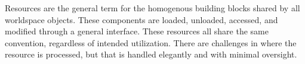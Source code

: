 Resources are the general term for the homogenous building blocks shared by all worldspace objects. These components are loaded, unloaded, accessed, and modified through a general interface. These resources all share the same convention, regardless of intended utilization. There are challenges in where the resource is processed, but that is handled elegantly and with minimal oversight.
